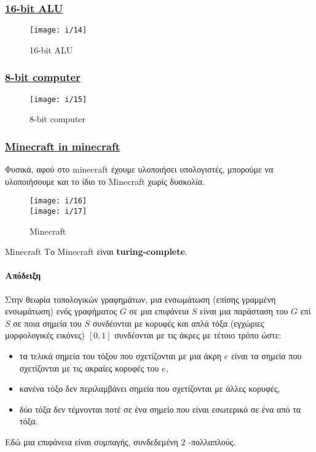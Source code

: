 \documentclass[11pt,a4paper,notitlepage,fleqn]{article}
\begin{document}
\subsubsection{\href{https://www.youtube.com/watch?v=LGkkyKZVzug}{16-bit ALU}}
\begin{figure}[h]
	\centering
	\texttt{[image: i/14]}
	\caption{16-bit ALU}
	\label{fig:14}
\end{figure}

\subsubsection{\href{https://www.youtube.com/watch?v=ydd6l3iYOZE}{8-bit computer}}

\begin{figure}[H]
	\centering
	\texttt{[image: i/15]}
	\caption{8-bit computer}
	\label{fig:15}
\end{figure}

\subsubsection{\href{https://www.youtube.com/watch?v=GwHBaSySHmo}{Minecraft in minecraft}}

Φυσικά, αφού στο minecraft έχουμε υλοποιήσει υπολογιστές, μπορούμε να υλοποιήσουμε και το ίδιο το Minecraft χωρίς δυσκολία.

\begin{figure}[H]
	\centering
	\texttt{[image: i/16]}\\[3ex]
	\texttt{[image: i/17]}
	\caption{Minecraft}
	\label{fig:17}
\end{figure}

\begin{theorem}{Minecraft}{}
	Το Minecraft είναι \textbf{turing-complete}.
\end{theorem}

\paragraph{Απόδειξη}

Στην θεωρία τοπολογικών γραφημάτων, μια ενσωμάτωση (επίσης γραμμένη ενσωμάτωση) ενός γραφήματος
$G$
σε μια επιφάνεια
$S$
είναι μια παράσταση του
$G$
επί
$S$
σε ποια σημεία του
$S$
συνδέονται με κορυφές και απλά τόξα (εγχώριες μορφολογικές εικόνες)
\( [0,1] \) συνδέονται με τις άκρες με τέτοιο τρόπο ώστε:
\begin{itemize}
\item τα τελικά σημεία του τόξου που σχετίζονται με μια άκρη
$e$
είναι τα σημεία που σχετίζονται με τις ακραίες κορυφές του
$e$,
\item κανένα τόξο δεν περιλαμβάνει σημεία που σχετίζονται με άλλες κορυφές,
\item δύο τόξα δεν τέμνονται ποτέ σε ένα σημείο που είναι εσωτερικό σε ένα από τα τόξα.
\end{itemize}
Εδώ μια επιφάνεια είναι συμπαγής, συνδεδεμένη
$2$
-πολλαπλούς.
\end{document}
